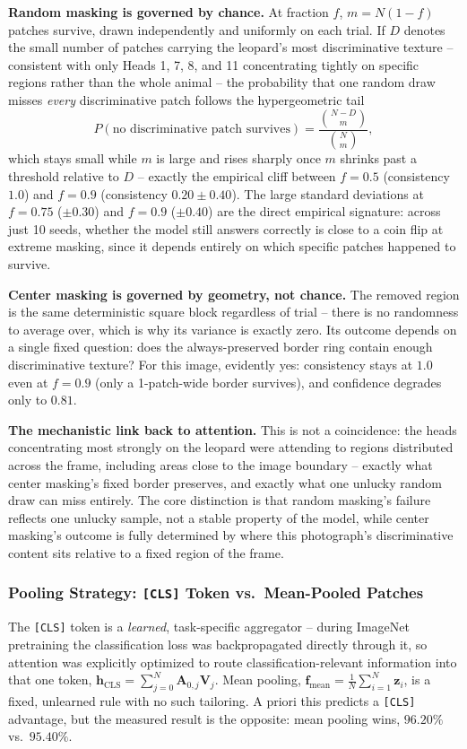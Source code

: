 \textbf{Random masking is governed by chance.} At fraction $f$, $m=N(1-f)$
patches survive, drawn independently and uniformly on each trial. If $D$
denotes the small number of patches carrying the leopard's most
discriminative texture -- consistent with only Heads 1, 7, 8, and 11
concentrating tightly on specific regions rather than the whole animal --
the probability that one random draw misses \emph{every} discriminative
patch follows the hypergeometric tail
\[
  P(\text{no discriminative patch survives}) = \frac{\binom{N-D}{m}}{\binom{N}{m}},
\]
which stays small while $m$ is large and rises sharply once $m$ shrinks
past a threshold relative to $D$ -- exactly the empirical cliff between
$f=0.5$ (consistency $1.0$) and $f=0.9$ (consistency $0.20\pm0.40$). The
large standard deviations at $f=0.75$ ($\pm0.30$) and $f=0.9$ ($\pm0.40$)
are the direct empirical signature: across just 10 seeds, whether the model
still answers correctly is close to a coin flip at extreme masking, since
it depends entirely on which specific patches happened to survive.

\textbf{Center masking is governed by geometry, not chance.} The removed
region is the same deterministic square block regardless of trial -- there
is no randomness to average over, which is why its variance is exactly
zero. Its outcome depends on a single fixed question: does the
always-preserved border ring contain enough discriminative texture? For
this image, evidently yes: consistency stays at $1.0$ even at $f=0.9$
(only a 1-patch-wide border survives), and confidence degrades only to
$0.81$.

\textbf{The mechanistic link back to attention.} This is not a
coincidence: the heads concentrating most strongly on the leopard were
attending to regions distributed across the frame, including areas close
to the image boundary -- exactly what center masking's fixed border
preserves, and exactly what one unlucky random draw can miss entirely. The
core distinction is that random masking's failure reflects one unlucky
sample, not a stable property of the model, while center masking's outcome
is fully determined by where this photograph's discriminative content sits
relative to a fixed region of the frame.

\subsubsection{Pooling Strategy: \texttt{[CLS]} Token vs.\ Mean-Pooled Patches}

The \texttt{[CLS]} token is a \emph{learned}, task-specific aggregator --
during ImageNet pretraining the classification loss was backpropagated
directly through it, so attention was explicitly optimized to route
classification-relevant information into that one token,
$\mathbf{h}_{\text{CLS}}=\sum_{j=0}^{N}\mathbf{A}_{0,j}\mathbf{V}_j$. Mean
pooling, $\mathbf{f}_{\text{mean}}=\frac{1}{N}\sum_{i=1}^{N}\mathbf{z}_i$,
is a fixed, unlearned rule with no such tailoring. A priori this predicts a
\texttt{[CLS]} advantage, but the measured result is the opposite: mean
pooling wins, $96.20\%$ vs.\ $95.40\%$.

